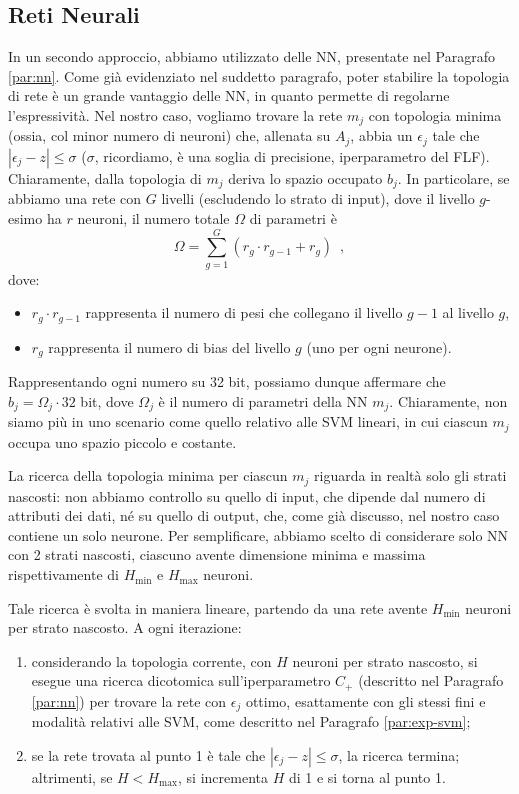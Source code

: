 \subsection{Reti Neurali}
\label{par:addestramento-nn}
In un secondo approccio, abbiamo utilizzato delle NN, presentate nel Paragrafo \ref{par:nn}. Come già evidenziato nel suddetto paragrafo, poter stabilire la topologia di rete è un grande vantaggio delle NN, in quanto permette di regolarne l'espressività. 
Nel nostro caso, vogliamo trovare la rete $m_j$ con topologia minima (ossia, col minor numero di neuroni) che, allenata su $A_j$, abbia un $\epsilon_j$ tale che $|\epsilon_j - z| \leq \sigma$ ($\sigma$, ricordiamo, è una soglia di precisione, iperparametro del FLF).
Chiaramente, dalla topologia di $m_j$ deriva lo spazio occupato $b_j$. In particolare, se abbiamo una rete con $G$ livelli (escludendo lo strato di input), dove il livello $g$-esimo ha $r$ neuroni, il numero totale $\Omega$ di parametri è
\begin{equation}
    \Omega = \sum_{g=1}^{G} (r_g \cdot r_{g-1} + r_g) \enspace,
\end{equation}
dove:
\begin{itemize}
    \item $r_g \cdot r_{g-1}$ rappresenta il numero di pesi che collegano il livello $g-1$ al livello $g$,
    \item $r_g$ rappresenta il numero di bias del livello $g$ (uno per ogni neurone).
\end{itemize}
Rappresentando ogni numero su 32 bit, possiamo dunque affermare che $b_j = \Omega_j \cdot 32$ bit, dove $\Omega_j$ è il numero di parametri della NN $m_j$. 
Chiaramente, non siamo più in uno scenario come quello relativo alle SVM lineari, in cui ciascun $m_j$ occupa uno spazio piccolo e costante.

La ricerca della topologia minima per ciascun $m_j$ riguarda in realtà solo gli strati nascosti: non abbiamo controllo su quello di input, che dipende dal numero di attributi dei dati, né su quello di output, che, come già discusso, nel nostro caso contiene un solo neurone. Per semplificare, abbiamo scelto di considerare solo NN con 2 strati nascosti, ciascuno avente dimensione minima e massima rispettivamente di $H_{\text{min}}$ e $H_{\text{max}}$ neuroni.

Tale ricerca è svolta in maniera lineare, partendo da una rete avente $H_{\text{min}}$ neuroni per strato nascosto. A ogni iterazione:
\begin{enumerate}
    \item considerando la topologia corrente, con $H$ neuroni per strato nascosto, si esegue una ricerca dicotomica sull'iperparametro $C_+$ (descritto nel Paragrafo \ref{par:nn}) per trovare la rete con $\epsilon_j$ ottimo, esattamente con gli stessi fini e modalità relativi alle SVM, come descritto nel Paragrafo \ref{par:exp-svm};
    \item se la rete trovata al punto 1 è tale che $|\epsilon_j - z| \leq \sigma$, la ricerca termina; altrimenti, se $H < H_{\text{max}}$, si incrementa $H$ di 1 e si torna al punto 1.
\end{enumerate}


